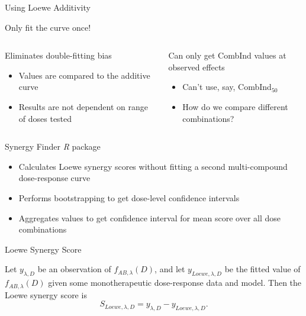 \documentclass{beamer}
\begin{document}
\begin{frame}[t]{Using Loewe Additivity}
    \begin{center}
        \alert{Only fit the curve once!}
        \noindent\makebox[\linewidth]{\rule{\textwidth}{0.4pt}}
    \end{center}
    \begin{columns}[c]
        \begin{column}[c]{0.4\textwidth}
            Eliminates double-fitting bias 
            \begin{itemize}
                \item \alert{Values} are compared to the additive curve
                \item Results are not dependent on range of doses tested
            \end{itemize}
        \end{column}
        \begin{column}[c]{0.4\textwidth}
            Can only get CombInd values at observed effects
            \begin{itemize}
                \item Can't use, say, CombInd$_{50}$
                \item How do we compare different combinations?
            \end{itemize}
        \end{column}
    \end{columns}
    \begin{center}
        \noindent\makebox[\linewidth]{\rule{\textwidth}{0.4pt}}
    \end{center}
\end{frame}

\begin{frame}{Synergy Finder}
    \textit{R} package
    \begin{itemize}
        \item Calculates Loewe synergy scores \alert{without} fitting a second multi-compound dose-response curve
        \item Performs bootstrapping to get dose-level confidence intervals
        \item Aggregates values to get confidence interval for mean score \alert{over all dose combinations}
    \end{itemize}
\end{frame}

\begin{frame}{Loewe Synergy Score}
    \begin{Definition}
        Let $y_{\lambda, D}$ be an observation of $f_{AB, \lambda}(D)$, and let $y_{Loewe, \lambda, D}$ be the fitted value of $f_{AB, \lambda}(D)$ given some monotherapeutic dose-response data and model.
        Then the \alert{Loewe synergy score} is \[
            S_{Loewe, \lambda, D} = y_{\lambda,D} - y_{Loewe, \lambda, D}.
        \]
    \end{Definition}
\end{frame}
\end{document}
